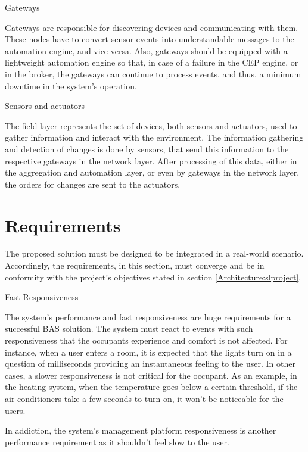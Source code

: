 \begin{Paragraph}{Gateways}
	
	Gateways are responsible for discovering devices and communicating with them. These nodes have to convert sensor events into understandable messages to the automation engine, and vice versa. Also, gateways should be equipped with a lightweight automation engine so that, in case of a failure in the CEP engine, or in the broker, the gateways can continue to process events, and thus, a minimum downtime in the system’s operation.

	
\end{Paragraph}

\begin{Paragraph}{Sensors and actuators}
	
The field layer represents the set of devices, both sensors and actuators, used to gather information and interact with the environment. The information gathering and detection of changes is done by sensors, that send this information to the respective gateways in the network layer. After processing of this data, either in the aggregation and automation layer, or even by gateways in the network layer, the orders for changes are sent to the actuators.
	
\end{Paragraph}

\section{Requirements}
\label{Architecture:Requirements}
The proposed solution must be designed to be integrated in a real-world scenario. Accordingly, the requirements, in this section, must converge and be in conformity with the project's objectives stated in section \ref{Architecture:slproject}. 

\begin{Paragraph}{Fast Responsiveness}

The system’s performance and fast responsiveness are huge requirements for a successful BAS solution. The system must react to events with such responsiveness that the occupants experience and comfort is not affected. For instance, when a user enters a room, it is expected that the lights turn on in a question of milliseconds providing an instantaneous feeling to the user. In other cases, a slower responsiveness is not critical for the occupant. As an example, in the heating system, when the temperature goes below a certain threshold, if the air conditioners take a few seconds to turn on, it won’t be noticeable for the users.

In addiction, the system's management platform responsiveness is another performance requirement as it shouldn't feel slow to the user.

\end{Paragraph}

